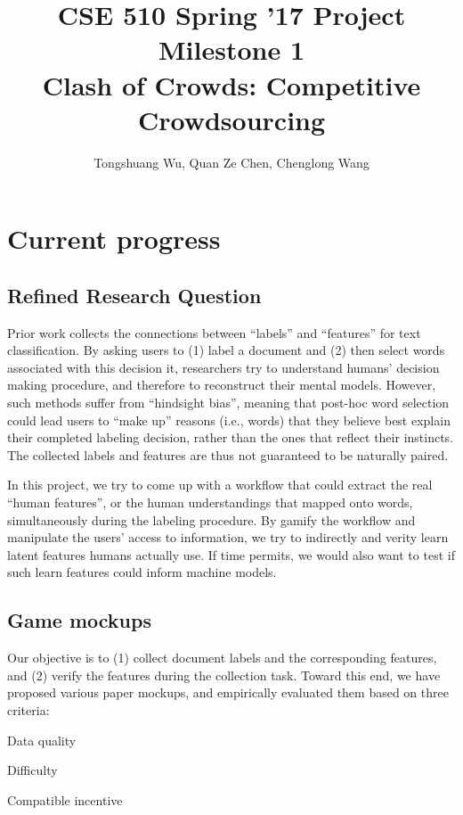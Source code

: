\documentclass{article}
\title{{\large{CSE 510 Spring '17 Project Milestone 1}}
\\ \textbf{Clash of Crowds: Competitive Crowdsourcing}}
\author{Tongshuang Wu, Quan Ze Chen, Chenglong Wang}
\date{}
\begin{document}
\maketitle


\section{Current progress}

\subsection{Refined Research Question}

Prior work collects the connections between  ``labels'' and ``features'' for text classification. 
By asking users to (1) label a document and (2) then select words associated with this decision it, researchers try to understand humans' decision making procedure, and therefore to reconstruct their mental models.
However, such methods suffer from ``hindsight bias'', meaning that post-hoc word selection could lead users to ``make up'' reasons (i.e., words) that they believe best explain their completed labeling decision, rather than the ones that reflect their instincts.
The collected labels and features are thus not guaranteed to be naturally paired.

In this project, we try to come up with a workflow that could extract the real ``human features'', or the human understandings that mapped onto words, simultaneously during the labeling procedure.
By gamify the workflow and manipulate the users' access to information, we try to indirectly and verity learn latent features humans actually use.
If time permits, we would also want to test if such learn features could inform machine models.

\subsection{Game mockups}
Our objective is to (1) collect document labels and the corresponding features, and (2) verify the features during the collection task.
Toward this end, we have proposed various paper mockups, and empirically evaluated them based on three criteria:
\begin{compactitem}
	\item Data quality
	\item Difficulty
	\item Compatible incentive
\end{compactitem}
 
\end{document}
